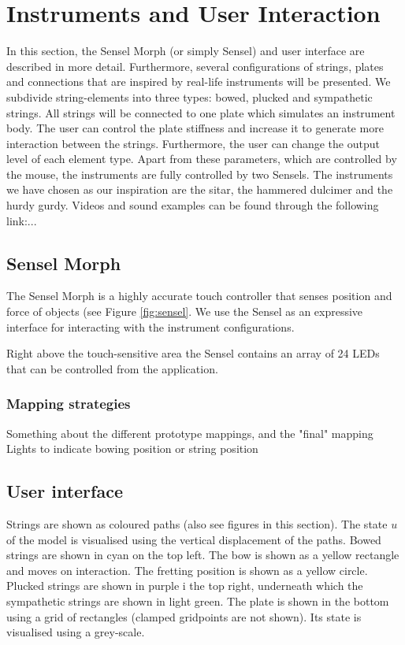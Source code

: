 \documentclass{article}
\begin{document}
\section{Instruments and User Interaction}\label{sec:instruments}
In this section, the Sensel Morph (or simply Sensel) and user interface are described in more detail. Furthermore, several configurations of strings, plates and connections that are inspired by real-life instruments will be presented. We subdivide string-elements into three types: bowed, plucked and sympathetic strings. All strings will be connected to one plate which simulates an instrument body. The user can control the plate stiffness and increase it to generate more interaction between the strings. Furthermore, the user can change the output level of each element type. Apart from these parameters, which are controlled by the mouse, the instruments are fully controlled by two Sensels. The instruments we have chosen as our inspiration are the sitar, the hammered dulcimer and the hurdy gurdy. Videos and sound examples can be found through the following link:...

\subsection{Sensel Morph}
The Sensel Morph is a highly accurate touch controller that senses position and force of objects (see Figure \ref{fig:sensel}. We use the Sensel as an expressive interface for interacting with the instrument configurations. 

Right above the touch-sensitive area the Sensel contains an array of 24 LEDs that can be controlled from the application.
\subsubsection{Mapping strategies}
Something about the different prototype mappings, and the "final" mapping 
Lights to indicate bowing position or string position   


\subsection{User interface}
Strings are shown as coloured paths (also see figures in this section). The state $u$ of the model is visualised using the vertical displacement of the paths. Bowed strings are shown in cyan on the top left. The bow is shown as a yellow rectangle and moves on interaction. The fretting position is shown as a yellow circle. Plucked strings are shown in purple i the top right, underneath which the sympathetic strings are shown in light green. The plate is shown in the bottom using a grid of rectangles (clamped gridpoints are not shown). Its state is visualised using a grey-scale.
\end{document}
